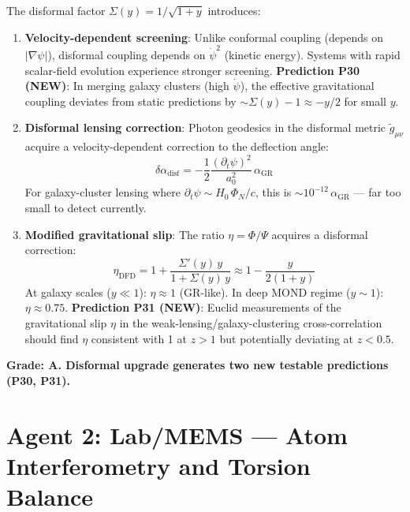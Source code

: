 \documentclass[11pt,a4paper]{article}
\begin{document}
The disformal factor $\Sigma(y) = 1/\sqrt{1+y}$ introduces:

\begin{enumerate}
\item \textbf{Velocity-dependent screening}: Unlike conformal coupling (depends on $|\nabla\psi|$), disformal coupling depends on $\dot{\psi}^2$ (kinetic energy). Systems with rapid scalar-field evolution experience stronger screening. \textbf{Prediction P30 (NEW)}: In merging galaxy clusters (high $\dot{\psi}$), the effective gravitational coupling deviates from static predictions by $\sim\Sigma(y) - 1 \approx -y/2$ for small $y$.

\item \textbf{Disformal lensing correction}: Photon geodesics in the disformal metric $\tilde{g}_{\mu\nu}$ acquire a velocity-dependent correction to the deflection angle:
\begin{equation}
\delta\alpha_\mathrm{disf} = -\frac{1}{2}\frac{(\partial_t\psi)^2}{a_0^2}\,\alpha_\mathrm{GR}
\end{equation}
For galaxy-cluster lensing where $\partial_t\psi \sim H_0\,\Phi_N/c$, this is $\sim 10^{-12}\,\alpha_\mathrm{GR}$ --- far too small to detect currently.

\item \textbf{Modified gravitational slip}: The ratio $\eta = \Phi/\Psi$ acquires a disformal correction:
\begin{equation}
\eta_\mathrm{DFD} = 1 + \frac{\Sigma'(y)\,y}{1 + \Sigma(y)\,y} \approx 1 - \frac{y}{2(1+y)}
\end{equation}
At galaxy scales ($y \ll 1$): $\eta \approx 1$ (GR-like). In deep MOND regime ($y \sim 1$): $\eta \approx 0.75$. \textbf{Prediction P31 (NEW)}: Euclid measurements of the gravitational slip $\eta$ in the weak-lensing/galaxy-clustering cross-correlation should find $\eta$ consistent with 1 at $z > 1$ but potentially deviating at $z < 0.5$.
\end{enumerate}

\textbf{Grade: A. Disformal upgrade generates two new testable predictions (P30, P31).}

\section{Agent 2: Lab/MEMS --- Atom Interferometry and Torsion Balance}
\end{document}
